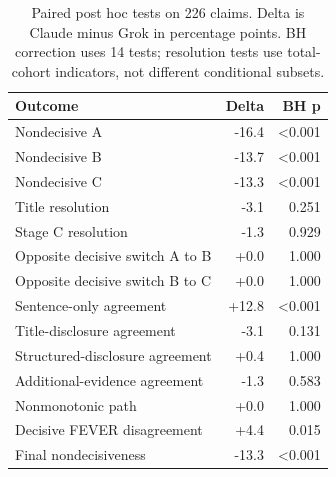 \begin{table}[H]\centering\small
\caption{Paired post hoc tests on 226 claims. Delta is Claude minus Grok in percentage points. BH correction uses 14 tests; resolution tests use total-cohort indicators, not different conditional subsets.}\label{tab:family_tests}
\begin{tabularx}{\linewidth}{Xrr}\toprule
Outcome & Delta & BH p \\\midrule
Nondecisive A & -16.4 & <0.001 \\
Nondecisive B & -13.7 & <0.001 \\
Nondecisive C & -13.3 & <0.001 \\
Title resolution & -3.1 & 0.251 \\
Stage C resolution & -1.3 & 0.929 \\
Opposite decisive switch A to B & +0.0 & 1.000 \\
Opposite decisive switch B to C & +0.0 & 1.000 \\
Sentence-only agreement & +12.8 & <0.001 \\
Title-disclosure agreement & -3.1 & 0.131 \\
Structured-disclosure agreement & +0.4 & 1.000 \\
Additional-evidence agreement & -1.3 & 0.583 \\
Nonmonotonic path & +0.0 & 1.000 \\
Decisive FEVER disagreement & +4.4 & 0.015 \\
Final nondecisiveness & -13.3 & <0.001 \\
\bottomrule
\end{tabularx}
\end{table}
